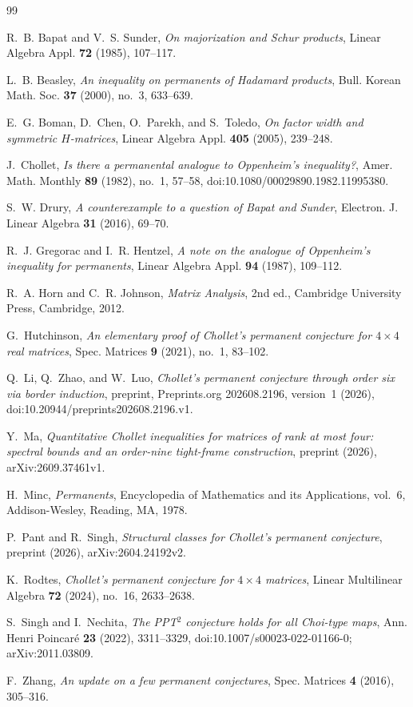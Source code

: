 \documentclass[11pt]{amsart}
\theoremstyle{remark}
\numberwithin{equation}{section}
\begin{document}
\begin{thebibliography}{99}

R.~B. Bapat and V.~S. Sunder, \emph{On majorization and Schur products}, Linear Algebra Appl. \textbf{72} (1985), 107--117.

L.~B. Beasley, \emph{An inequality on permanents of Hadamard products}, Bull. Korean Math. Soc. \textbf{37} (2000), no.~3, 633--639.

E.~G. Boman, D.~Chen, O.~Parekh, and S.~Toledo, \emph{On factor width and symmetric $H$-matrices}, Linear Algebra Appl. \textbf{405} (2005), 239--248.

J.~Chollet, \emph{Is there a permanental analogue to Oppenheim's inequality?}, Amer. Math. Monthly \textbf{89} (1982), no.~1, 57--58, doi:10.1080/00029890.1982.11995380.

S.~W. Drury, \emph{A counterexample to a question of Bapat and Sunder}, Electron. J. Linear Algebra \textbf{31} (2016), 69--70.

R.~J. Gregorac and I.~R. Hentzel, \emph{A note on the analogue of Oppenheim's inequality for permanents}, Linear Algebra Appl. \textbf{94} (1987), 109--112.

R.~A. Horn and C.~R. Johnson, \emph{Matrix Analysis}, 2nd ed., Cambridge University Press, Cambridge, 2012.

G.~Hutchinson, \emph{An elementary proof of Chollet's permanent conjecture for $4\times4$ real matrices}, Spec. Matrices \textbf{9} (2021), no.~1, 83--102.

Q.~Li, Q.~Zhao, and W.~Luo, \emph{Chollet's permanent conjecture through order six via border induction}, preprint, Preprints.org 202608.2196, version~1 (2026), doi:10.20944/preprints202608.2196.v1.

Y.~Ma, \emph{Quantitative Chollet inequalities for matrices of rank at most four: spectral bounds and an order-nine tight-frame construction}, preprint (2026), arXiv:2609.37461v1.

H.~Minc, \emph{Permanents}, Encyclopedia of Mathematics and its Applications, vol.~6, Addison-Wesley, Reading, MA, 1978.

P.~Pant and R.~Singh, \emph{Structural classes for Chollet's permanent conjecture}, preprint (2026), arXiv:2604.24192v2.

K.~Rodtes, \emph{Chollet's permanent conjecture for $4\times4$ matrices}, Linear Multilinear Algebra \textbf{72} (2024), no.~16, 2633--2638.

S.~Singh and I.~Nechita, \emph{The PPT$^2$ conjecture holds for all Choi-type maps}, Ann. Henri Poincar\'e \textbf{23} (2022), 3311--3329, doi:10.1007/s00023-022-01166-0; arXiv:2011.03809.

F.~Zhang, \emph{An update on a few permanent conjectures}, Spec. Matrices \textbf{4} (2016), 305--316.

\end{thebibliography}
\end{document}

